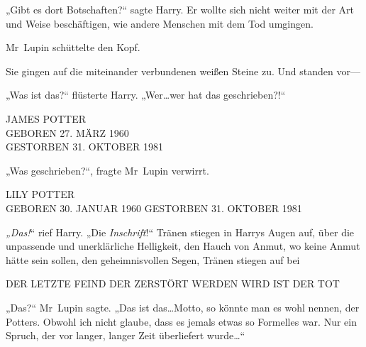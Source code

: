 „Gibt es dort Botschaften?“ sagte Harry. Er wollte sich nicht weiter mit der Art und Weise beschäftigen, wie andere Menschen mit dem Tod umgingen.

Mr~Lupin schüttelte den Kopf.


Sie gingen auf die miteinander verbundenen weißen Steine zu. Und standen vor—

„Was ist das?“ flüsterte Harry. „Wer…wer hat das geschrieben?!“

\begin{center}
JAMES POTTER\\
GEBOREN 27. MÄRZ 1960\\
GESTORBEN 31. OKTOBER 1981
\end{center}

„Was geschrieben?“, fragte Mr~Lupin verwirrt.

\begin{center}
LILY POTTER\\
GEBOREN 30. JANUAR 1960
GESTORBEN 31. OKTOBER 1981
\end{center}

\emph{„Das!}“ rief Harry. „Die \emph{Inschrift}!“
Tränen stiegen in Harrys Augen auf, über die unpassende und unerklärliche Helligkeit, den Hauch von Anmut, wo keine Anmut hätte sein sollen, den geheimnisvollen Segen, Tränen stiegen auf bei

\begin{center}
DER LETZTE FEIND DER ZERSTÖRT WERDEN WIRD IST DER TOT
\end{center}

„Das?“ Mr~Lupin sagte. „Das ist das…Motto, so könnte man es wohl nennen, der Potters. Obwohl ich nicht glaube, dass es jemals etwas so Formelles war. Nur ein Spruch, der vor langer, langer Zeit überliefert wurde…“

